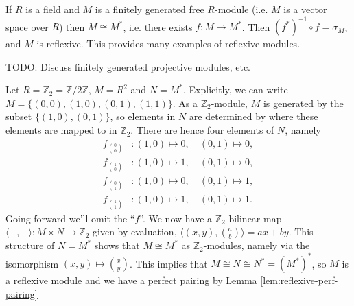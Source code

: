 If $R$ is a field and $M$ is a finitely generated free $R$-module (i.e. $M$ is a vector space over $R$) then $M \cong M^*$, i.e. there exists $f : M \to M^*$. Then $(f^*)^{-1} \circ f  = \sigma_M$, and $M$ is reflexive. This provides many examples of reflexive modules. 

TODO: Discuss finitely generated projective modules, etc. 
\begin{example}
    \label{eg:ZmodTwoSquared-reflexive}
    Let $R=\mathbb{Z}_2 = \mathbb{Z}/2\mathbb{Z}$, $M=R^2$ and $N=M^*$. Explicitly, we can write $ M=\{(0,0), (1,0), (0,1), (1,1)\}$. As a $\mathbb{Z}_2$-module, $M$ is generated by the subset $\{(1,0), (0,1)\}$, so elements in $N$ are determined by where these elements are mapped to in $\mathbb{Z}_2$.
    There are hence four elements of $N$, namely
    \begin{align*}
        f_{0\choose0}&: (1,0)\mapsto 0,\quad (0,1)\mapsto 0,\\
        f_{1\choose0}&: (1,0)\mapsto 1,\quad (0,1)\mapsto 0,\\
        f_{0\choose1}&: (1,0)\mapsto 0,\quad (0,1)\mapsto 1,\\
        f_{1\choose1}&: (1,0)\mapsto 1,\quad (0,1)\mapsto 1.
    \end{align*}
    Going forward we'll omit the ``$f$''.
    We now have a $\mathbb{Z}_2$ bilinear map $\langle{-},{-}\rangle:M\times N \to \mathbb{Z}_2$ given by evaluation, $\langle (x,y),{a\choose b} \rangle = ax+by$.
    This structure of $N=M^*$ shows that $M\cong M^*$ as $\mathbb{Z}_2$-modules, namely via the isomorphism $(x,y) \mapsto {x\choose y}$. This implies that $M\cong N \cong N^* = (M^*)^*$, so $M$ is a reflexive module and we have a perfect pairing by Lemma \ref{lem:reflexive-perf-pairing}    
\end{example}



